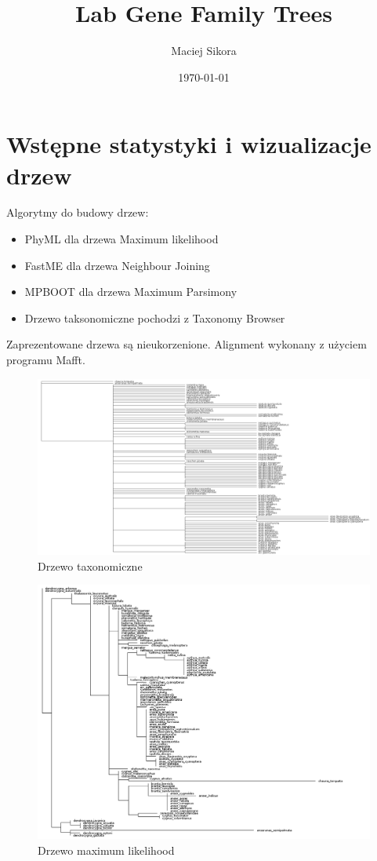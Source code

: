 \documentclass[12pt]{article}
\title{Lab Gene Family Trees}
\author{Maciej Sikora}
\date{\specialdate\today}
\begin{document}
\maketitle

\section{Wstępne statystyki i wizualizacje drzew}
Algorytmy do budowy drzew:
\begin{itemize}
\item PhyML dla drzewa Maximum likelihood
\item FastME dla drzewa Neighbour Joining
\item MPBOOT dla drzewa Maximum Parsimony
\item Drzewo taksonomiczne pochodzi z Taxonomy Browser
\end{itemize}
Zaprezentowane drzewa są nieukorzenione.
Alignment wykonany z użyciem programu Mafft.

\begin{figure}[H]
\begin{center}
\includegraphics[width=\textwidth]{taxonomy}
\caption{Drzewo taxonomiczne}
\end{center}
\end{figure}

\begin{figure}[H]
\begin{center}
\includegraphics[width=\textwidth]{ml}
\caption{Drzewo maximum likelihood}
\end{center}
\end{figure}
\end{document}
